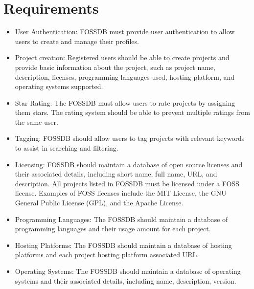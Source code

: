 \pagebreak
\section{Requirements}

\begin{itemize}
    \item User Authentication: FOSSDB must provide user authentication to allow users to
    create and manage their profiles.

    \item Project creation: Registered users should be able to create projects and provide
    basic information about the project, such as project name, description, licenses,
    programming languages used, hosting platform, and operating systems supported.

    \item Star Rating: The FOSSDB must allow users to rate projects by assigning them stars.
    The rating system should be able to prevent multiple ratings from the same user.

    \item Tagging: FOSSDB should allow users to tag projects with relevant keywords
    to assist in searching and filtering.

    \item Licensing: FOSSDB should maintain a database of open source licenses and
    their associated details, including short name, full name, URL, and description.
    All projects listed in FOSSDB must be licensed under a FOSS license.
    Examples of FOSS licenses include the MIT License, the GNU General Public License (GPL),
    and the Apache License.

    \item Programming Languages: The FOSSDB should maintain a database of programming
    languages and their usage amount for each project.

    \item Hosting Platforms: The FOSSDB should maintain a database of hosting platforms
    and each project hosting platform associated URL.

    \item Operating Systems: The FOSSDB should maintain a database of operating systems and
    their associated details, including name, description, version.
\end{itemize}
